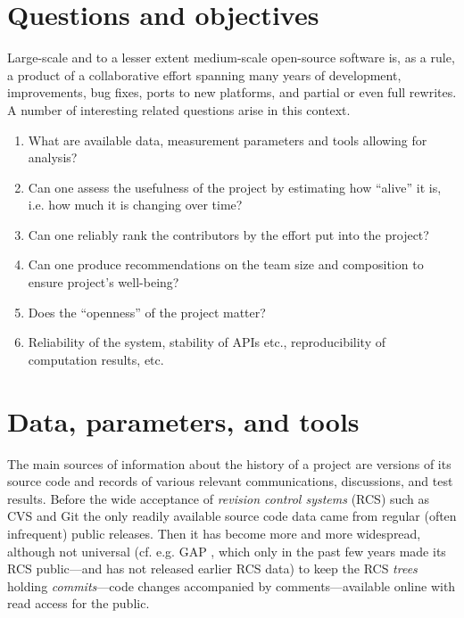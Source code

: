 \documentclass{deliverablereport}
\author{Dmitrii Pasechnik}
\begin{document}
\maketitle
%
\strut\githubissuedescription
\newpage\tableofcontents

\section{Questions and objectives}

Large-scale and to a lesser extent medium-scale open-source software 
is, as a rule, a product of a collaborative effort spanning many years of
development, improvements, bug fixes, ports to new platforms,
and partial or even full rewrites. A number of interesting related questions
arise in this context.
\begin{enumerate}
\item What are available data, measurement parameters and tools
allowing for analysis?
\item Can one assess the usefulness of the project by estimating
how ``alive'' it is, i.e. how much it is changing over time?
\item Can one reliably rank the contributors
by the effort put into the project?
\item Can one produce recommendations on the team size and composition
to ensure project's well-being?
\item Does the ``openness'' of the project matter?
\item Reliability of the system, stability of APIs etc., 
reproducibility of computation results, etc.
\end{enumerate}

\section{Data, parameters, and tools}

The main sources of information about the history of a project are versions of
its source code and records of various relevant communications, discussions, and
test results.  Before the wide acceptance of {\em revision control systems} 
(RCS) \cite{OSullivan:MakingSenseOfRCS} such as  CVS \cite{CVSWeb} and
Git \cite{ChaStr:pg14} the only readily available source code data came from
regular (often infrequent) public releases. Then it has become
more and more widespread, although not universal (cf. e.g. GAP \cite{gap},
which only in the past few years made its RCS 
public---and has not released earlier RCS data)
to keep the RCS {\em trees} holding {\em commits}---code changes
accompanied by comments---available online with read access for the public.
\end{document}
